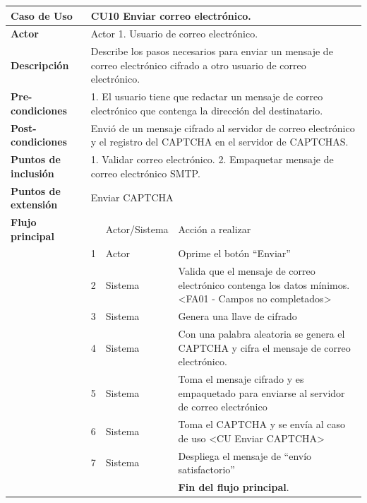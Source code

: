 \documentclass[12pt,oneside,onecolumn,openany]{report}
\begin{document}
\begin{table}[H]
 \centering
   {
     \begin{tabular}{| p{} | p{} |p{4cm}|p{5cm}|}
     \hline
     \textbf{Caso de Uso} &\multicolumn{3}{|l|}{CU10 Enviar correo electrónico.}\\
     \hline
     \textbf{Actor} & \multicolumn{3}{|l|}{Actor 1. Usuario de correo electrónico.}\\
     \hline
     \textbf{Descripción} & \multicolumn{3}{|p{10cm}|}{Describe los pasos necesarios para enviar un mensaje de correo electrónico cifrado a otro usuario de correo electrónico.}\\
     \hline
     \textbf{Pre-condiciones} & \multicolumn{3}{|p{10cm}|}{1. El usuario tiene que redactar un mensaje de correo electrónico que contenga la dirección del destinatario.}\\
     \hline
     \textbf{Post-condiciones} & \multicolumn{3}{|p{10cm}|}{Envió de un mensaje cifrado al servidor de correo electrónico y el registro del CAPTCHA en el servidor de CAPTCHAS.}\\
     \hline
     \textbf{Puntos de inclusión} & \multicolumn{3}{|p{10cm}|}{1. Validar correo electrónico. 2. Empaquetar mensaje de correo electrónico SMTP.}\\
     \hline
     \textbf{Puntos de extensión} & \multicolumn{3}{|l|}{Enviar CAPTCHA}\\
     \hline
     \textbf{Flujo principal} & & Actor/Sistema & Acción a realizar\\
     \hline
     & 1 & Actor & Oprime el botón ``Enviar''\\
     \hline
     & 2 & Sistema & Valida que el mensaje de correo electrónico contenga los datos mínimos.<FA01 - Campos no completados>\\
     \hline
     & 3 & Sistema & Genera una llave de cifrado\\
     \hline
     & 4 & Sistema & Con una palabra aleatoria se genera el CAPTCHA y cifra el mensaje de correo electrónico.\\
     \hline
     & 5 & Sistema & Toma el mensaje cifrado y es empaquetado para enviarse al servidor de correo electrónico\\
     \hline
     & 6 & Sistema & Toma el CAPTCHA  y se envía al caso de uso <CU Enviar CAPTCHA>\\
     \hline
     & 7 & Sistema & Despliega el mensaje de ``envío satisfactorio''\\
     \hline
     & & & \textbf{Fin del flujo principal}.\\

\end{tabular}}
\end{table}
\end{document}
